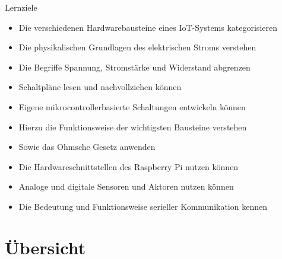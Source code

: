 \begin{frame}{Lernziele}
    \begin{itemize}
        \item Die verschiedenen Hardwarebausteine eines IoT-Systems kategorisieren
        \item Die physikalischen Grundlagen des elektrischen Stroms verstehen
        \item Die Begriffe \glqq{}Spannung\grqq{}, \glqq{}Stromstärke\grqq{} und
              \glqq{}Widerstand\grqq{} abgrenzen
        \item Schaltpläne lesen und nachvollziehen können
        \item Eigene mikrocontrollerbasierte Schaltungen entwickeln können
        \item Hierzu die Funktionsweise der wichtigsten Bausteine verstehen
        \item Sowie das Ohmsche Gesetz anwenden
        \item Die Hardwareschnittstellen des Raspberry Pi nutzen können
        \item Analoge und digitale Sensoren und Aktoren nutzen können
        \item Die Bedeutung und Funktionsweise serieller Kommunikation kennen
    \end{itemize}
\end{frame}

\section{Übersicht}

{

    \begin{frame}[plain]
    \end{frame}
}

